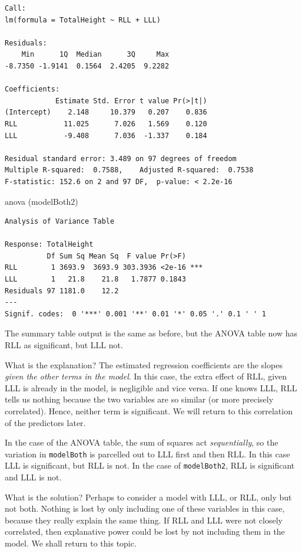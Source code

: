 \documentclass[
  oneside]{krantz}
\newenvironment{Shaded}{\begin{snugshade}}{\end{snugshade}}
\newcommand{\FunctionTok}[1]{\textcolor[rgb]{0.00,0.00,0.00}{#1}}
\newcommand{\NormalTok}[1]{#1}
\begin{document}
\begin{verbatim}
Call:
lm(formula = TotalHeight ~ RLL + LLL)

Residuals:
    Min      1Q  Median      3Q     Max 
-8.7350 -1.9141  0.1564  2.4205  9.2282 

Coefficients:
            Estimate Std. Error t value Pr(>|t|)
(Intercept)    2.148     10.379   0.207    0.836
RLL           11.025      7.026   1.569    0.120
LLL           -9.408      7.036  -1.337    0.184

Residual standard error: 3.489 on 97 degrees of freedom
Multiple R-squared:  0.7588,    Adjusted R-squared:  0.7538 
F-statistic: 152.6 on 2 and 97 DF,  p-value: < 2.2e-16
\end{verbatim}

\begin{Shaded}
\begin{Highlighting}[]
\FunctionTok{anova}\NormalTok{ (modelBoth2)}
\end{Highlighting}
\end{Shaded}

\begin{verbatim}
Analysis of Variance Table

Response: TotalHeight
          Df Sum Sq Mean Sq  F value Pr(>F)    
RLL        1 3693.9  3693.9 303.3936 <2e-16 ***
LLL        1   21.8    21.8   1.7877 0.1843    
Residuals 97 1181.0    12.2                    
---
Signif. codes:  0 '***' 0.001 '**' 0.01 '*' 0.05 '.' 0.1 ' ' 1
\end{verbatim}

The summary table output is the same as before, but the ANOVA table now has RLL as significant, but LLL not.

What is the explanation? The estimated regression coefficients are the slopes \emph{given the other terms in the model}. In this case, the extra effect of RLL, given LLL is already in the model, is negligible and vice versa. If one knows LLL, RLL tells us nothing because the two variables are so similar (or more precisely correlated). Hence, neither term is significant. We will return to this correlation of the predictors later.

In the case of the ANOVA table, the sum of squares act \emph{sequentially}, so the variation in \texttt{modelBoth} is parcelled out to LLL first and then RLL. In this case LLL is significant, but RLL is not. In the case of \texttt{modelBoth2}, RLL is significant and LLL is not.

What is the solution? Perhaps to consider a model with LLL, or RLL, only but not both. Nothing is lost by only including one of these variables in this case, because they really explain the same thing. If RLL and LLL were not closely correlated, then explanative power could be lost by not including them in the model. We shall return to this topic.
\end{document}
